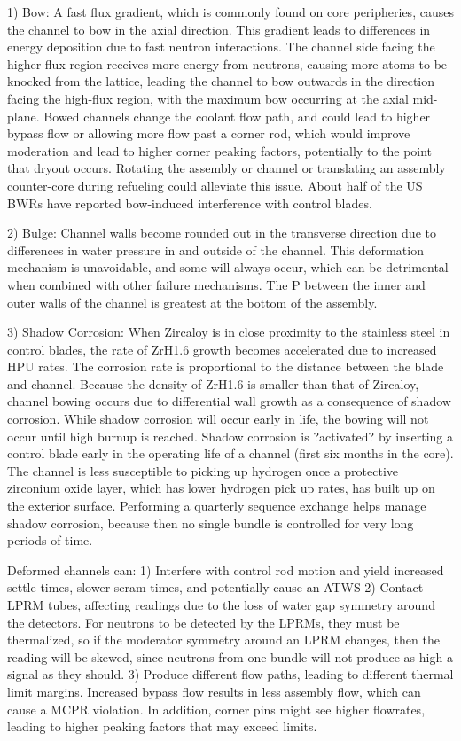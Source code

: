 \documentclass[10pt]{article}
\begin{document}
1)	Bow: A fast flux gradient, which is commonly found on core peripheries, causes the channel to bow in the axial direction. This gradient leads to differences in energy deposition due to fast neutron interactions. The channel side facing the higher flux region receives more energy from neutrons, causing more atoms to be knocked from the lattice, leading the channel to bow outwards in the direction facing the high-flux region, with the maximum bow occurring at the axial mid-plane. Bowed channels change the coolant flow path, and could lead to higher bypass flow or allowing more flow past a corner rod, which would improve moderation and lead to higher corner peaking factors, potentially to the point that dryout occurs. Rotating the assembly or channel or translating an assembly counter-core during refueling could alleviate this issue. About half of the US BWRs have reported bow-induced interference with control blades. 

2)	Bulge: Channel walls become rounded out in the transverse direction due to differences in water pressure in and outside of the channel. This deformation mechanism is unavoidable, and some will always occur, which can be detrimental when combined with other failure mechanisms. The P between the inner and outer walls of the channel is greatest at the bottom of the assembly. 

3)	Shadow Corrosion: When Zircaloy is in close proximity to the stainless steel in control blades, the rate of ZrH1.6 growth becomes accelerated due to increased HPU rates. The corrosion rate is proportional to the distance between the blade and channel. Because the density of ZrH1.6 is smaller than that of Zircaloy, channel bowing occurs due to differential wall growth as a consequence of shadow corrosion. While shadow corrosion will occur early in life, the bowing will not occur until high burnup is reached. Shadow corrosion is ?activated? by inserting a control blade early in the operating life of a channel (first six months in the core). The channel is less susceptible to picking up hydrogen once a protective zirconium oxide layer, which has lower hydrogen pick up rates, has built up on the exterior surface. Performing a quarterly sequence exchange helps manage shadow corrosion, because then no single bundle is controlled for very long periods of time. 

Deformed channels can:
1)	Interfere with control rod motion and yield increased settle times, slower scram times, and potentially cause an ATWS
2)	Contact LPRM tubes, affecting readings due to the loss of water gap symmetry around the detectors. For neutrons to be detected by the LPRMs, they must be thermalized, so if the moderator symmetry around an LPRM changes, then the reading will be skewed, since neutrons from one bundle will not produce as high a signal as they should. 
3)	Produce different flow paths, leading to different thermal limit margins. Increased bypass flow results in less assembly flow, which can cause a MCPR violation. In addition, corner pins might see higher flowrates, leading to higher peaking factors that may exceed limits. 
\end{document}
